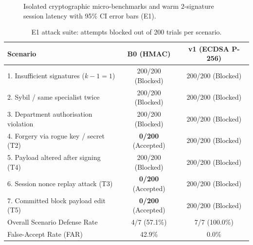 \documentclass[journal]{IEEEtran}
\begin{document}
\begin{figure}[t]
\centering
{}
\caption{Isolated cryptographic micro-benchmarks and warm $2$-signature session latency with 95\% CI error bars (E1).}
\label{fig:e1}
\end{figure}

\begin{table}[t]
\centering
\caption{E1 attack suite: attempts blocked out of 200 trials per scenario.}
\label{tab:attacks}
\footnotesize
\begin{tabular}{@{}p{4.2cm}cc@{}}
\toprule
Scenario & B0 (HMAC) & v1 (ECDSA P-256) \\
\midrule
1. Insufficient signatures ($k-1=1$) & 200/200 (Blocked) & 200/200 (Blocked) \\
2. Sybil / same specialist twice & 200/200 (Blocked) & 200/200 (Blocked) \\
3. Department authorisation violation & 200/200 (Blocked) & 200/200 (Blocked) \\
4. Forgery via rogue key / secret (T2) & \textbf{0/200} (Accepted) & 200/200 (Blocked) \\
5. Payload altered after signing (T4) & 200/200 (Blocked) & 200/200 (Blocked) \\
6. Session nonce replay attack (T3) & \textbf{0/200} (Accepted) & 200/200 (Blocked) \\
7. Committed block payload edit (T5) & \textbf{0/200} (Accepted) & 200/200 (Blocked) \\
\midrule
Overall Scenario Defense Rate & 4/7 (57.1\%) & 7/7 (100.0\%) \\
False-Accept Rate (FAR) & 42.9\% & 0.0\% \\
\bottomrule
\end{tabular}
\end{table}
\end{document}
